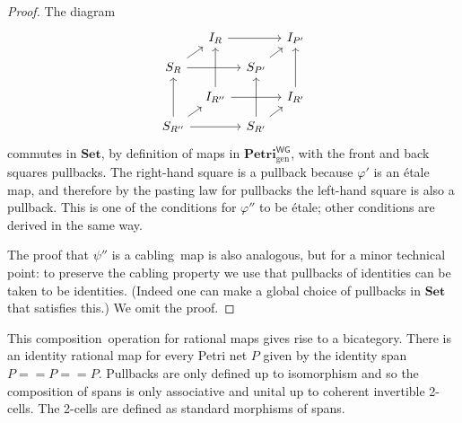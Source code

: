 \documentclass[11pt,a4paper]{article}
\theoremstyle{plain}
\theoremstyle{definition}
\theoremstyle{remark}
\newcommand{\WGPetri}{\mathbf{Petri}^{\mathsf{WG}}}
\newcommand{\Set}{\mathbf{Set}}
\begin{document}
\begin{proof}
 The diagram
\[\begin{tikzcd}[row sep=0.8em, column sep=0.8em]
	& {I_R} && {I_{P'}} \\
	{S_{R}} && {S_{P'}} \\
	& {I_{R''}} && {I_{R'}} \\
	{S_{R''}} && {S_{R'}}
	\arrow[from=1-2, to=1-4]
	\arrow[from=2-1, to=1-2]
	\arrow[from=2-1, to=2-3]
	\arrow[from=2-3, to=1-4]
	\arrow[from=3-2, to=1-2]
	\arrow[from=3-2, to=3-4]
	\arrow[from=3-4, to=1-4]
	\arrow[from=4-1, to=2-1]
	\arrow[from=4-1, to=3-2]
	\arrow[from=4-1, to=4-3]
	\arrow[from=4-3, to=2-3]
	\arrow[from=4-3, to=3-4]
\end{tikzcd}\]
commutes in $\Set$, by definition of maps in $\WGPetri_{\mathrm{gen}}$, with the front and back squares pullbacks. The right-hand square is a pullback because $\varphi'$ is an \'etale map, and therefore by the pasting law for pullbacks the left-hand square is also a pullback. This is one of the conditions for $\varphi''$ to be \'etale; other conditions are derived in the same way. 

The proof that $\psi''$ is a cabling map is also analogous, but for a minor technical point: to preserve the cabling property we use that pullbacks of identities can be taken to be identities. (Indeed one can make a global choice of pullbacks in $\Set$ that satisfies this.) We omit the proof. 
\end{proof}

This composition operation for rational maps gives rise to a bicategory. There is an identity rational map for every Petri net $P$ given by the identity span $P =\!= P =\!= P$. Pullbacks are only defined up to isomorphism and so the composition of spans is
only associative and unital up to coherent invertible 2-cells. The 2-cells are
defined as standard morphisms of spans.
\end{document}
